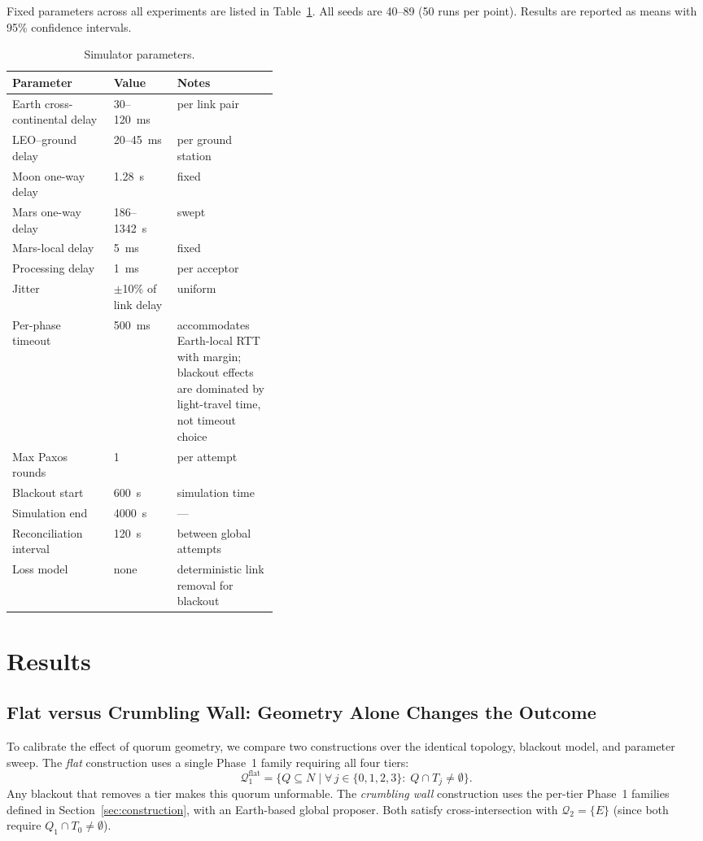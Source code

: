 \documentclass[11pt]{article}
\begin{document}
Fixed parameters across all experiments are listed in Table~\ref{tab:params}. All seeds are 40--89 (50 runs per point). Results are reported as means with 95\% confidence intervals.

\begin{table}[t]
\centering
\small
\caption{Simulator parameters.}
\label{tab:params}
\begin{tabular}{llp{0.38\linewidth}}
\toprule
Parameter & Value & Notes \\
\midrule
Earth cross-continental delay & 30--120~ms & per link pair \\
LEO--ground delay & 20--45~ms & per ground station \\
Moon one-way delay & 1.28~s & fixed \\
Mars one-way delay & 186--1342~s & swept \\
Mars-local delay & 5~ms & fixed \\
Processing delay & 1~ms & per acceptor \\
Jitter & $\pm$10\% of link delay & uniform \\
Per-phase timeout & 500~ms & accommodates Earth-local RTT with margin; blackout effects are dominated by light-travel time, not timeout choice \\
Max Paxos rounds & 1 & per attempt \\
Blackout start & 600~s & simulation time \\
Simulation end & 4000~s & --- \\
Reconciliation interval & 120~s & between global attempts \\
Loss model & none & deterministic link removal for blackout \\
\bottomrule
\end{tabular}
\end{table}


\section{Results}
\label{sec:results}

\subsection{Flat versus Crumbling Wall: Geometry Alone Changes the Outcome}

To calibrate the effect of quorum geometry, we compare two constructions over the identical topology, blackout model, and parameter sweep. The \emph{flat} construction uses a single Phase~1 family requiring all four tiers:
\[
\mathcal{Q}_1^{\text{flat}} = \bigl\{Q \subseteq N \;\big|\; \forall\, j \in \{0,1,2,3\}:\; Q \cap T_j \neq \emptyset\bigr\}.
\]
Any blackout that removes a tier makes this quorum unformable. The \emph{crumbling wall} construction uses the per-tier Phase~1 families defined in Section~\ref{sec:construction}, with an Earth-based global proposer. Both satisfy cross-intersection with $\mathcal{Q}_2 = \{E\}$ (since both require $Q_1 \cap T_0 \neq \emptyset$).
\end{document}
